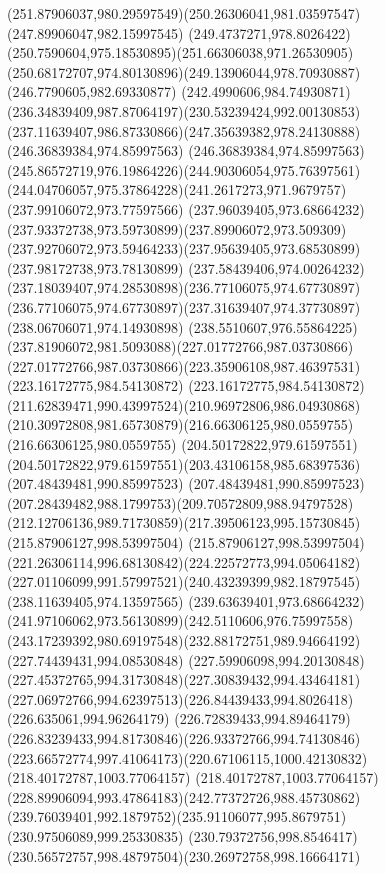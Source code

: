 {{\curveto(251.87906037,980.29597549)(250.26306041,981.03597547)(247.89906047,982.15997545)
\curveto(249.4737271,978.8026422)(250.7590604,975.18530895)(251.66306038,971.26530905)
\curveto(250.68172707,974.80130896)(249.13906044,978.70930887)(246.7790605,982.69330877)
\curveto(242.4990606,984.74930871)(236.34839409,987.87064197)(230.53239424,992.00130853)
\curveto(237.11639407,986.87330866)(247.35639382,978.24130888)(246.36839384,974.85997563)
\curveto(246.36839384,974.85997563)(245.86572719,976.19864226)(244.90306054,975.76397561)
\curveto(244.04706057,975.37864228)(241.2617273,971.9679757)(237.99106072,973.77597566)
\curveto(237.96039405,973.68664232)(237.93372738,973.59730899)(237.89906072,973.509309)
\curveto(237.92706072,973.59464233)(237.95639405,973.68530899)(237.98172738,973.78130899)
\curveto(237.58439406,974.00264232)(237.18039407,974.28530898)(236.77106075,974.67730897)
\curveto(236.77106075,974.67730897)(237.31639407,974.37730897)(238.06706071,974.14930898)
\curveto(238.5510607,976.55864225)(237.81906072,981.5093088)(227.01772766,987.03730866)
\curveto(227.01772766,987.03730866)(223.35906108,987.46397531)(223.16172775,984.54130872)
\curveto(223.16172775,984.54130872)(211.62839471,990.43997524)(210.96972806,986.04930868)
\curveto(210.30972808,981.65730879)(216.66306125,980.0559755)(216.66306125,980.0559755)
\lineto(204.50172822,979.61597551)
\curveto(204.50172822,979.61597551)(203.43106158,985.68397536)(207.48439481,990.85997523)
\curveto(207.48439481,990.85997523)(207.28439482,988.1799753)(209.70572809,988.94797528)
\curveto(212.12706136,989.71730859)(217.39506123,995.15730845)(215.87906127,998.53997504)
\curveto(215.87906127,998.53997504)(221.26306114,996.68130842)(224.22572773,994.05064182)
\curveto(227.01106099,991.57997521)(240.43239399,982.18797545)(238.11639405,974.13597565)
\curveto(239.63639401,973.68664232)(241.97106062,973.56130899)(242.5110606,976.75997558)
\curveto(243.17239392,980.69197548)(232.88172751,989.94664192)(227.74439431,994.08530848)
\curveto(227.59906098,994.20130848)(227.45372765,994.31730848)(227.30839432,994.43464181)
\curveto(227.06972766,994.62397513)(226.84439433,994.8026418)(226.635061,994.96264179)
\curveto(226.72839433,994.89464179)(226.83239433,994.81730846)(226.93372766,994.74130846)
\curveto(223.66572774,997.41064173)(220.67106115,1000.42130832)(218.40172787,1003.77064157)
\curveto(218.40172787,1003.77064157)(228.89906094,993.47864183)(242.77372726,988.45730862)
\curveto(239.76039401,992.1879752)(235.91106077,995.8679751)(230.97506089,999.25330835)
\curveto(230.79372756,998.8546417)(230.56572757,998.48797504)(230.26972758,998.16664171)
}}
